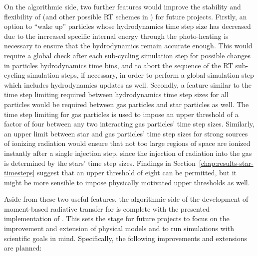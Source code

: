 On the algorithmic side, two further features would improve the stability and flexibility of \GEARRT
(and other possible RT schemes in \swift) for future projects. Firstly, an option to ``wake up''
particles whose hydrodynamics time step size has decreased due to the increased specific internal
energy through the photo-heating is necessary to ensure that the hydrodynamics remain accurate
enough. This would require a global check after each sub-cycling simulation step for possible
changes in particles hydrodynamics time bins, and to abort the sequence of the RT sub-cycling
simulation steps, if necessary, in order to perform a global simulation step which includes
hydrodynamics updates as well. Secondly, a feature similar to the time step limiting required
between hydrodynamics time step sizes for all particles would be required between gas particles and
star particles as well. The time step limiting for gas particles is used to impose an upper
threshold of a factor of four between any two interacting gas particles' time step sizes. Similarly,
an upper limit between star and gas particles' time step sizes for strong sources of ionizing
radiation would ensure that not too large regions of space are ionized instantly after a single
injection step, since the injection of radiation into the gas is determined by the stars' time step
sizes. Findings in Section~\ref{chap:results-star-timesteps} suggest that an upper threshold of
eight can be permitted, but it might be more sensible to impose physically motivated upper thresholds as well.

Aside from these two useful features, the algorithmic side of the development of moment-based
radiative transfer for \swift is complete with the presented implementation of \GEARRT. This sets
the stage for future projects to focus on the improvement and extension of physical models and to
run simulations with scientific goals in mind. Specifically, the following improvements and
extensions are planned:

